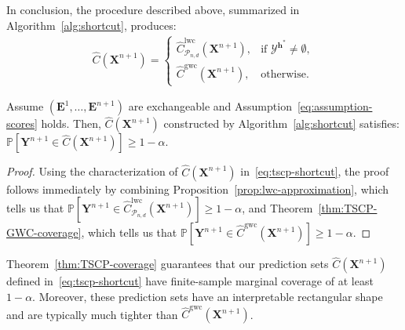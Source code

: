 In conclusion, the procedure described above, summarized in Algorithm~\ref{alg:shortcut}, produces:
\begin{align} \label{eq:tscp-shortcut}
  \hat{C}(\mathbf{X}^{n+1}) = \begin{cases}
  \hat{C}^\mathrm{lwc}_{\mathcal{P}_{n,d}}(\mathbf{X}^{n+1}), &\text{if }\mathcal{Y}^{\mathbf{h}^*} \neq \emptyset, \\
\hat{C}^\mathrm{gwc}(\mathbf{X}^{n+1}), &\text{otherwise.}
\end{cases}
\end{align}
\begin{theorem} \label{thm:TSCP-coverage}
Assume $(\mathbf{E}^1,\ldots,\mathbf{E}^{n+1})$ are exchangeable and Assumption~\ref{eq:assumption-scores} holds.
Then, $\hat{C}(\mathbf{X}^{n+1})$ constructed by Algorithm~\ref{alg:shortcut} satisfies: $\mathbb{P}[ \mathbf{Y}^{n+1} \in \hat{C}(\mathbf{X}^{n+1}) ] \ge 1 - \alpha$.
\end{theorem}
\begin{proof}
Using the characterization of $\hat{C}(\mathbf{X}^{n+1})$ in~\eqref{eq:tscp-shortcut}, the proof follows immediately by combining Proposition~\ref{prop:lwc-approximation}, which tells us that $\mathbb{P}[ \mathbf{Y}^{n+1} \in \hat{C}^{\mathrm{lwc}}_{\mathcal{P}_{n,d}}(\mathbf{X}^{n+1}) ] \ge 1 - \alpha$, and Theorem~\ref{thm:TSCP-GWC-coverage}, which tells us that $\mathbb{P}[ \mathbf{Y}^{n+1} \in \hat{C}^{\mathrm{gwc}}(\mathbf{X}^{n+1}) ] \ge 1 - \alpha$.
\end{proof}

Theorem~\ref{thm:TSCP-coverage} guarantees that our prediction sets $\hat{C}(\mathbf{X}^{n+1})$ defined in~\eqref{eq:tscp-shortcut} have finite-sample marginal coverage of at least $1-\alpha$.
Moreover, these prediction sets have an interpretable rectangular shape and are typically much tighter than $\hat{C}^\mathrm{gwc}(\mathbf{X}^{n+1})$.


